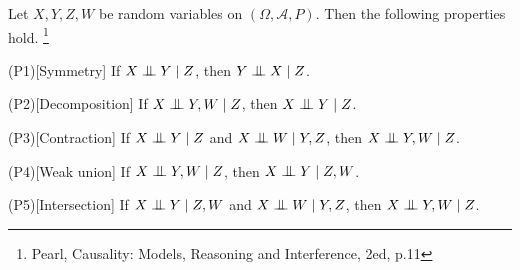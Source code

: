 \begin{lemma}
Let $X,Y,Z,W$ be random variables on $(\Omega,\mathcal{A},P)$. Then the
following properties hold.
\footnote{Pearl, Causality: Models, Reasoning and Interference, 2ed, p.11}

(P1)[Symmetry] If $X\bigCI Y \mid Z$, then $Y\bigCI X \mid Z$.

(P2)[Decomposition] If $X\bigCI Y,W \mid Z$, then $X\bigCI Y\mid Z$.

(P3)[Contraction] If $X\bigCI Y \mid Z$ and $X\bigCI W \mid Y,Z$, 
    then $X\bigCI Y,W\mid Z$.

(P4)[Weak union] If $X\bigCI Y,W \mid Z$, then $X\bigCI Y\mid Z,W$.

(P5)[Intersection] If $X\bigCI Y\mid Z,W$ and $X\bigCI W\mid Y,Z$, 
    then $X\bigCI Y,W\mid Z$.
\end{lemma}
